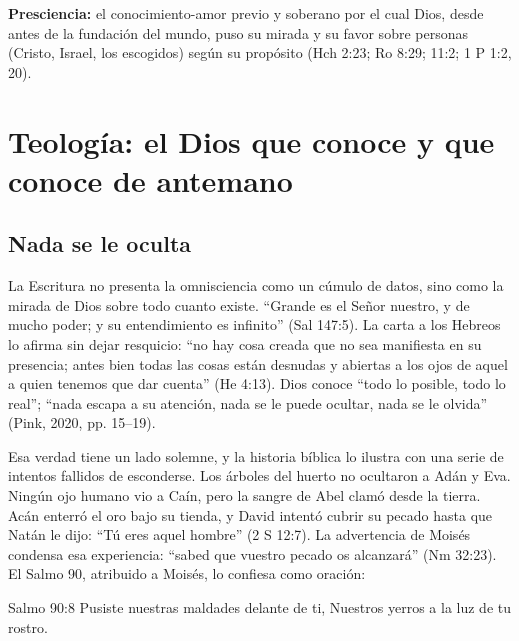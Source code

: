 
\begin{tcolorbox}[colback=papiro,colframe=dorado,boxrule=1.2pt,arc=3pt]
\textbf{Presciencia:} el conocimiento-amor previo y soberano por el cual Dios, desde antes de la fundación del mundo, puso su mirada y su favor sobre personas (Cristo, Israel, los escogidos) según su propósito (Hch 2:23; Ro 8:29; 11:2; 1 P 1:2, 20).
\end{tcolorbox}

\section{Teología: el Dios que conoce y que conoce de antemano}

\subsection{Nada se le oculta}
La Escritura no presenta la omnisciencia como un cúmulo de datos, sino como la mirada de Dios sobre todo cuanto existe. ``Grande es el Señor nuestro, y de mucho poder; y su entendimiento es infinito'' (Sal 147:5). La carta a los Hebreos lo afirma sin dejar resquicio: ``no hay cosa creada que no sea manifiesta en su presencia; antes bien todas las cosas están desnudas y abiertas a los ojos de aquel a quien tenemos que dar cuenta'' (He 4:13). Dios conoce ``todo lo posible, todo lo real''; ``nada escapa a su atención, nada se le puede ocultar, nada se le olvida'' (Pink, 2020, pp. 15--19).

Esa verdad tiene un lado solemne, y la historia bíblica lo ilustra con una serie de intentos fallidos de esconderse. Los árboles del huerto no ocultaron a Adán y Eva. Ningún ojo humano vio a Caín, pero la sangre de Abel clamó desde la tierra. Acán enterró el oro bajo su tienda, y David intentó cubrir su pecado hasta que Natán le dijo: ``Tú eres aquel hombre'' (2 S 12:7). La advertencia de Moisés condensa esa experiencia: ``sabed que vuestro pecado os alcanzará'' (Nm 32:23). El Salmo 90, atribuido a Moisés, lo confiesa como oración:

\begin{verso}{Salmo 90:8}
Pusiste nuestras maldades delante de ti, Nuestros yerros a la luz de tu rostro.
\end{verso}

